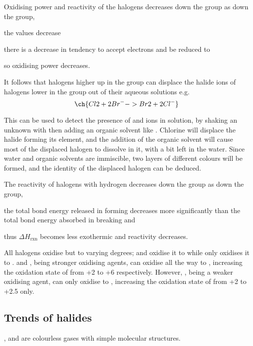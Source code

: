 \documentclass[Chemistry.tex]{subfiles}
\begin{document}
Oxidising power and reactivity of the halogens decreases down the group as down the group, \begin{slinenum}
\item the \slEo{} values decrease
\item there is a decrease in tendency to accept electrons and be reduced to 
\item so oxidising power decreases.
\end{slinenum}

It follows that halogens higher up in the group can displace the halide ions of halogens lower in the group out of their aqueous solutions e.g. \[\ch{Cl2 + 2 Br^- -> Br2 + 2 Cl^-}\]

This can be used to detect the presence of  and  ions in solution, by shaking an unknown with  then adding an organic solvent like . Chlorine will displace the halide forming its element, and the addition of the organic solvent will cause most of the displaced halogen to dissolve in it, with a bit left in the water. Since water and organic solvents are immiscible, two layers of different colours will be formed, and the identity of the displaced halogen can be deduced.

The reactivity of halogens with hydrogen decreases down the group as down the group, \begin{slinenum}
\item the total bond energy released in forming  decreases more significantly than the total bond energy absorbed in breaking  and 
\item thus \(\Delta H_\text{rxn}\) becomes less exothermic and reactivity decreases.
\end{slinenum}

All halogens oxidise  but to varying degrees;  and  oxidise it to  while  only oxidises it to .  and , being stronger oxidising agents, can oxidise  all the way to , increasing the oxidation state of  from +2 to +6 respectively. However, , being a weaker oxidising agent, can only oxidise  to , increasing the oxidation state of  from +2 to +2.5 only.
\subsection{Trends of halides}
,  and  are colourless gases with simple molecular structures.
\end{document}
